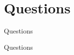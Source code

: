 \documentclass[11pt]{beamer}
\begin{document}
\section{Questions}

\begin{frame}{Questions}
	\begin{center}
	{\LARGE Questions}
	\end{center}
\end{frame}
\end{document}
